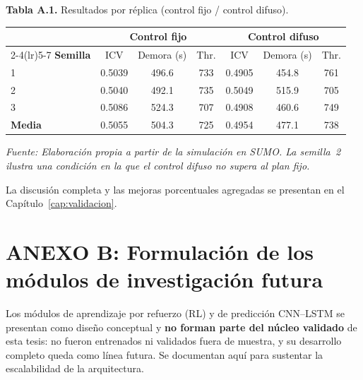 \noindent\textbf{Tabla A.1.} Resultados por réplica (control fijo / control difuso).
\begin{center}
\begin{tabular}{@{}lcccccc@{}}
\toprule
 & \multicolumn{3}{c}{\textbf{Control fijo}} & \multicolumn{3}{c}{\textbf{Control difuso}} \\
\cmidrule(lr){2-4}\cmidrule(lr){5-7}
\textbf{Semilla} & ICV & Demora (s) & Thr. & ICV & Demora (s) & Thr. \\
\midrule
1 & 0.5039 & 496.6 & 733 & 0.4905 & 454.8 & 761 \\
2 & 0.5040 & 492.1 & 735 & 0.5049 & 515.9 & 705 \\
3 & 0.5086 & 524.3 & 707 & 0.4908 & 460.6 & 749 \\
\midrule
\textbf{Media} & 0.5055 & 504.3 & 725 & 0.4954 & 477.1 & 738 \\
\bottomrule
\end{tabular}
\end{center}
{\footnotesize\itshape Fuente: Elaboración propia a partir de la simulación en SUMO. La semilla~2 ilustra
una condición en la que el control difuso no supera al plan fijo.\par}

\vspace{0.4cm}
La discusión completa y las mejoras porcentuales agregadas se presentan en el
Capítulo~\ref{cap:validacion}.

\section*{ANEXO B: Formulación de los módulos de investigación futura}
\label{anexo:futuros}

Los módulos de aprendizaje por refuerzo (RL) y de predicción CNN--LSTM se presentan como diseño conceptual y
\textbf{no forman parte del núcleo validado} de esta tesis: no fueron entrenados ni validados fuera de
muestra, y su desarrollo completo queda como línea futura. Se documentan aquí para sustentar la
escalabilidad de la arquitectura.

